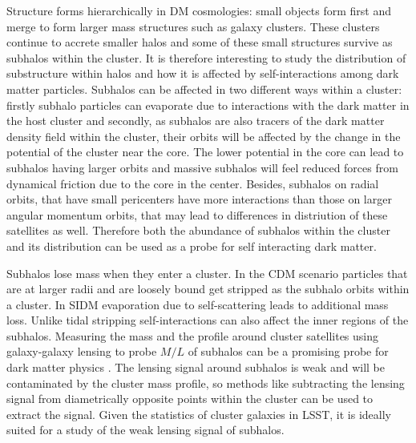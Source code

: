 Structure forms hierarchically in DM cosmologies: small objects form first and merge to form larger mass structures such as galaxy clusters. These clusters continue to accrete smaller halos and some of these small structures survive as subhalos within the cluster. It is therefore interesting to study the distribution of substructure within halos and how it is affected by self-interactions among dark matter particles. Subhalos can be affected in two different ways within a cluster: firstly  subhalo particles can evaporate due to interactions with the dark matter in the host cluster and secondly, as subhalos are also tracers of the dark matter density field within the cluster, their orbits will be affected by the change in the potential of the cluster near the core. The lower potential in the core can lead to subhalos having larger orbits and massive subhalos will feel reduced forces from dynamical friction due to the core in the center. Besides, subhalos on radial orbits, that have small pericenters have more interactions than those on larger angular momentum orbits, that may lead to differences in distriution of these satellites as well.  Therefore both the abundance of subhalos within the cluster and its distribution can be used as a probe for self interacting dark matter.  


Subhalos lose mass when they enter a cluster. In the CDM scenario particles that are at larger radii and are loosely bound get stripped as the subhalo orbits within a cluster. In SIDM evaporation due to self-scattering leads to additional mass loss. Unlike tidal stripping self-interactions can also affect the inner regions of the subhalos. Measuring the mass and the profile around cluster satellites using galaxy-galaxy lensing to probe $M/L$ of subhalos can be a promising probe for dark matter physics \cite{Natarajan:2017sbo}. The lensing signal around subhalos is weak and will be contaminated by the cluster mass profile, so methods like subtracting the lensing signal from diametrically opposite points within the cluster can be used to  extract the signal. Given the statistics of cluster galaxies in LSST, it is ideally suited for a study of the weak lensing signal of subhalos. 


